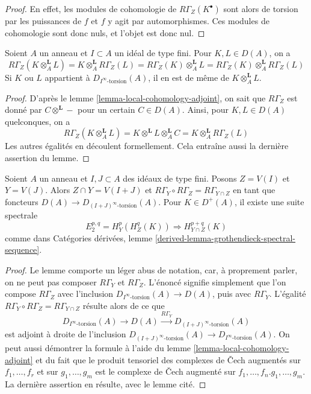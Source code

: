 \begin{proof}
En effet, les modules de cohomologie de $R\Gamma_Z(K^\bullet)$ sont alors de torsion
par les puissances de $f$ et $f$ y agit par automorphismes.
Ces modules de cohomologie sont donc nuls, et l'objet est donc nul.
\end{proof}

\begin{lemma}
\label{lemma-torsion-tensor-product}
Soient $A$ un anneau et $I \subset A$ un idéal de type fini.
Pour $K, L \in D(A)$, on a
$$
R\Gamma_Z(K \otimes_A^\mathbf{L} L) =
K \otimes_A^\mathbf{L} R\Gamma_Z(L) =
R\Gamma_Z(K) \otimes_A^\mathbf{L} L =
R\Gamma_Z(K) \otimes_A^\mathbf{L} R\Gamma_Z(L)
$$
Si $K$ ou $L$ appartient à $D_{I^\infty\text{-torsion}}(A)$,
il en est de même de $K \otimes_A^\mathbf{L} L$.
\end{lemma}

\begin{proof}
D'après le lemme \ref{lemma-local-cohomology-adjoint}, on sait que $R\Gamma_Z$ est donné par $C \otimes^\mathbf{L} -$
pour un certain $C \in D(A)$. Ainsi, pour $K, L \in D(A)$ quelconques, on a
$$
R\Gamma_Z(K \otimes_A^\mathbf{L} L) =
K \otimes^\mathbf{L} L \otimes_A^\mathbf{L} C =
K \otimes_A^\mathbf{L} R\Gamma_Z(L)
$$
Les autres égalités en découlent formellement.
Cela entraîne aussi la dernière assertion du lemme.
\end{proof}

\begin{lemma}
\label{lemma-local-cohomology-ss}
Soient $A$ un anneau et $I, J \subset A$ des idéaux de type fini.
Posons $Z = V(I)$ et $Y = V(J)$. Alors $Z \cap Y = V(I + J)$
et $R\Gamma_Y \circ R\Gamma_Z = R\Gamma_{Y \cap Z}$ en tant que foncteurs
$D(A) \to D_{(I + J)^\infty\text{-torsion}}(A)$. Pour $K \in D^+(A)$,
il existe une suite spectrale
$$
E_2^{p, q} = H^p_Y(H^q_Z(K)) \Rightarrow H^{p + q}_{Y \cap Z}(K)
$$
comme dans Catégories dérivées, lemme \ref{derived-lemma-grothendieck-spectral-sequence}.
\end{lemma}

\begin{proof}
Le lemme comporte un léger abus de notation, car, à proprement parler,
on ne peut pas composer $R\Gamma_Y$ et $R\Gamma_Z$.
L'énoncé signifie simplement que l'on compose $R\Gamma_Z$ avec l'inclusion $D_{I^\infty\text{-torsion}}(A) \to D(A)$,
puis avec $R\Gamma_Y$. L'égalité $R\Gamma_Y \circ R\Gamma_Z = R\Gamma_{Y \cap Z}$ résulte alors de ce que
$$
D_{I^\infty\text{-torsion}}(A) \to D(A) \xrightarrow{R\Gamma_Y}
D_{(I + J)^\infty\text{-torsion}}(A)
$$
est adjoint à droite de l'inclusion
$D_{(I + J)^\infty\text{-torsion}}(A) \to D_{I^\infty\text{-torsion}}(A)$.
On peut aussi démontrer la formule à l'aide du lemme \ref{lemma-local-cohomology-adjoint}
et du fait que le produit tensoriel des complexes de
{\v C}ech augmentés sur $f_1, \ldots, f_r$ et sur $g_1, \ldots, g_m$
est le complexe de {\v C}ech augmenté sur $f_1, \ldots, f_n. g_1, \ldots, g_m$.
La dernière assertion en résulte, avec le lemme cité.
\end{proof}

